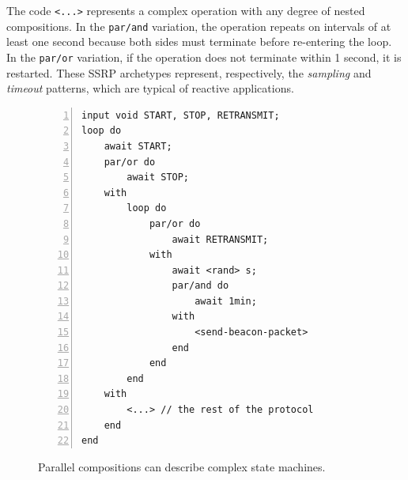 \documentclass{sigplanconf}
\newcommand{\code}[1] {{\small{\texttt{#1}}}}
\newcommand{\1}{\;}
\newcommand{\2}{\;\;}
\newcommand{\3}{\;\;\;}
\newcommand{\5}{\;\;\;\;\;}
\begin{document}
The code \code{<...>} represents a complex operation with any degree of nested 
compositions.
%
In the \code{par/and} variation, the operation repeats on intervals of at least 
one second because both sides must terminate before re-entering the loop.
In the \code{par/or} variation, if the operation does not terminate within 1 
second, it is restarted.
%
These SSRP archetypes represent, respectively, the \emph{sampling} and 
\emph{timeout} patterns, which are typical of reactive applications.


\begin{figure}[t]
\begin{lstlisting}[numbers=left,xleftmargin=3em]
input void START, STOP, RETRANSMIT;
loop do
    await START;
    par/or do
        await STOP;
    with
        loop do
            par/or do
                await RETRANSMIT;
            with
                await <rand> s;
                par/and do
                    await 1min;
                with
                    <send-beacon-packet>
                end
            end
        end
    with
        <...> // the rest of the protocol
    end
end
\end{lstlisting}
\caption{ Parallel compositions can describe complex state machines.
\label{lst.ctp}
}
\end{figure}
\end{document}
